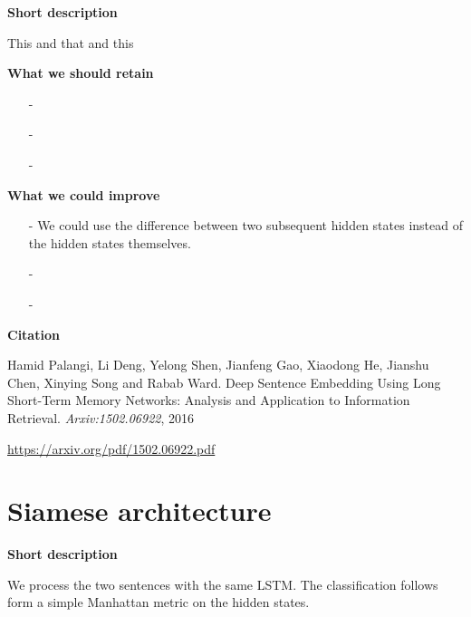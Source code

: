 
\textbf{Short description}

This and that and this

    

\textbf{What we should retain}

\begin{enumerate}[topsep = 0pt, itemsep = 0pt]
    \item[-] 
    
    \item[-] 
    
    \item[-]
    
\end{enumerate}


\textbf{What we could improve}

\begin{enumerate}[topsep = 0pt, itemsep = 0pt]
    \item[-] We could use the difference between two subsequent hidden states instead of the hidden states themselves.
    
    \item[-] 
    
    \item[-]
    
\end{enumerate}


\textbf{Citation}

    Hamid Palangi, Li Deng, Yelong Shen, Jianfeng Gao, Xiaodong He, Jianshu Chen, Xinying Song and Rabab Ward.
    Deep Sentence Embedding Using Long Short-Term Memory Networks: Analysis and Application to Information Retrieval.
    \textit{Arxiv:1502.06922}, 2016

\url{https://arxiv.org/pdf/1502.06922.pdf}



\newpage
\section{Siamese architecture}


\textbf{Short description}

We process the two sentences with the same LSTM. The classification follows form a simple Manhattan metric on the hidden states.

